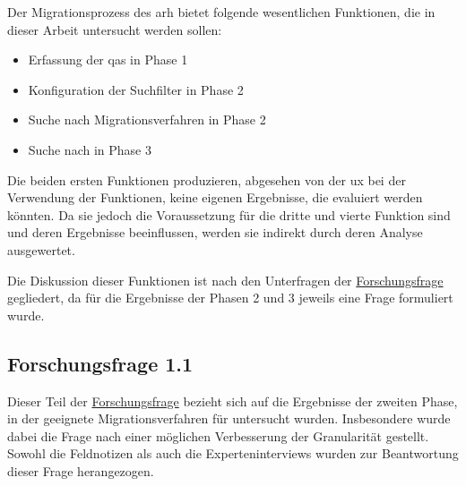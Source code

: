 Der Migrationsprozess des \gls{arh} bietet folgende wesentlichen Funktionen, die in dieser Arbeit untersucht werden sollen:
\begin{itemize}
	\item Erfassung der \glspl{qa} in Phase 1
	\item Konfiguration der Suchfilter in Phase 2
	\item Suche nach Migrationsverfahren in Phase 2
	\item Suche nach \bpp in Phase 3
\end{itemize}
Die beiden ersten Funktionen produzieren, abgesehen von der \gls{ux} bei der Verwendung der Funktionen, keine eigenen Ergebnisse, die evaluiert werden könnten.
Da sie jedoch die Voraussetzung für die dritte und vierte Funktion sind und deren Ergebnisse beeinflussen, werden sie indirekt durch deren Analyse ausgewertet.

Die Diskussion dieser Funktionen ist nach den Unterfragen der \hyperref[forschungsfrage:1]{Forschungsfrage} gegliedert, da für die Ergebnisse der Phasen 2 und 3 jeweils eine Frage formuliert wurde.



\subsection{Forschungsfrage 1.1}
Dieser Teil der \hyperref[forschungsfrage:1]{Forschungsfrage} bezieht sich auf die Ergebnisse der zweiten Phase, in der geeignete Migrationsverfahren für \jf untersucht wurden.
Insbesondere wurde dabei die Frage nach einer möglichen Verbesserung der Granularität gestellt.
Sowohl die Feldnotizen als auch die Experteninterviews wurden zur Beantwortung dieser Frage herangezogen.


